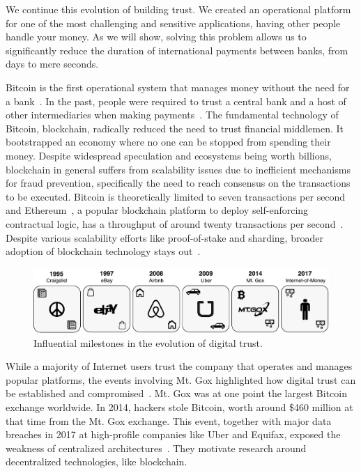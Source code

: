 We continue this evolution of building trust.
We created an operational platform for one of the most challenging and sensitive applications, having other people handle your money.
As we will show, solving this problem allows us to significantly reduce the duration of international payments between banks, from days to mere seconds.

Bitcoin is the first operational system that manages money without the need for a bank~\cite{nakamoto2008bitcoin}.
In the past, people were required to trust a central bank and a host of other intermediaries when making payments~\cite{kokkola2011payment}.
The fundamental technology of Bitcoin, blockchain, radically reduced the need to trust financial middlemen.
It bootstrapped an economy where no one can be stopped from spending their money.
Despite widespread speculation and ecosystems being worth billions, blockchain in general suffers from scalability issues due to inefficient mechanisms for fraud prevention, specifically the need to reach consensus on the transactions to be executed.
Bitcoin is theoretically limited to seven transactions per second and Ethereum~\cite{wood2014ethereum}, a popular blockchain platform to deploy self-enforcing contractual logic, has a throughput of around twenty transactions per second~\cite{vukolic2015quest}.
Despite various scalability efforts like proof-of-stake and sharding, broader adoption of blockchain technology stays out~\cite{zhou2020solutions}.

\begin{figure}[!t]
	\centering
	\includegraphics[width=\linewidth]{iom/assets/timeline}
	\caption{Influential milestones in the evolution of digital trust.}
	\label{fig:trust_evolution}
\end{figure}

While a majority of Internet users trust the company that operates and manages popular platforms, the events involving Mt. Gox highlighted how digital trust can be established and compromised~\cite{mcmillan2014inside}.
Mt. Gox was at one point the largest Bitcoin exchange worldwide.
In 2014, hackers stole Bitcoin, worth around \$460 million at that time from the Mt. Gox exchange. %
This event, together with major data breaches in 2017 at high-profile companies like Uber and Equifax, exposed the weakness of centralized architectures~\cite{uber2017hack}.
They motivate research around decentralized technologies, like blockchain. %

